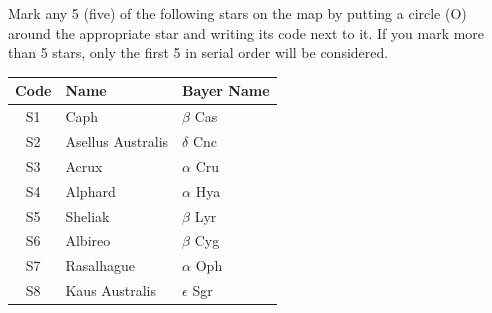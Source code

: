 Mark any 5 (five) of the following stars on the map by putting a circle (O)
around the appropriate star and writing its code next to it. If you mark
more than 5 stars, only the first 5 in serial order will be considered.

\begin{center}
\begin{tabular}{cll}
Code & Name & Bayer Name \\
\hline
S1 & Caph & $\beta$ Cas \\
S2 & Asellus Australis & $\delta$ Cnc \\
S3 & Acrux & $\alpha$ Cru \\
S4 & Alphard & $\alpha$ Hya \\
S5 & Sheliak & $\beta$ Lyr \\
S6 & Albireo & $\beta$ Cyg \\
S7 & Rasalhague & $\alpha$ Oph \\
S8 & Kaus Australis & $\epsilon$ Sgr \\
\end{tabular}
\end{center}

